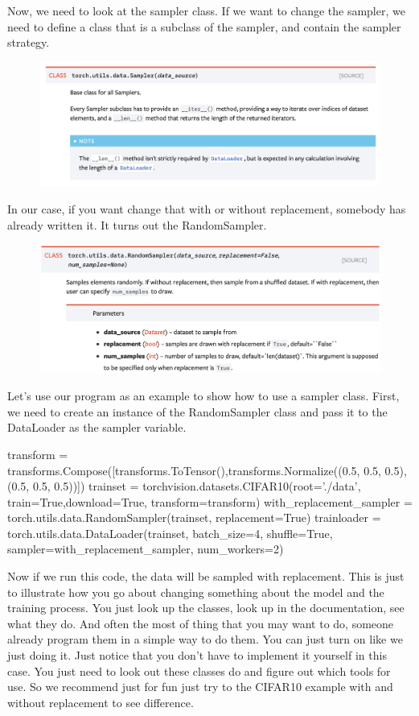 Now, we need to look at the sampler class. If we want to change the sampler, we need to define a class that is a subclass of the sampler, and contain the sampler strategy.
\begin{figure}[H]
\centering
\includegraphics[scale=0.4]{./figures/497Proj_Sampler}
\end{figure}
In our case, if you want change that with or without replacement, somebody has already written it. 
It turns out the RandomSampler.
\begin{figure}[H]
\centering
\includegraphics[scale=0.4]{./figures/497Proj_RandomSampler}
\end{figure}
Let's use our program as an example to show how to use a sampler class. First, we need to create an instance of the RandomSampler class and pass it to the DataLoader as the sampler variable.
\begin{python}
	transform = transforms.Compose([transforms.ToTensor(),transforms.Normalize((0.5, 0.5, 0.5), (0.5, 0.5, 0.5))])
	trainset = torchvision.datasets.CIFAR10(root='./data', train=True,download=True, transform=transform)
	with_replacement_sampler = torch.utils.data.RandomSampler(trainset, replacement=True)
	trainloader = torch.utils.data.DataLoader(trainset, batch_size=4, shuffle=True, sampler=with_replacement_sampler, num_workers=2)
\end{python}
Now if we run this code, the data will be sampled with replacement. This is just to illustrate how you go about changing something about the model and the training process. You just look up the classes, look up in the documentation, see what they do. And often the most of thing that you may want to do, someone already program them in a simple way to do them. You can just turn on like we just doing it. Just notice that you don't have to implement it yourself in this case. You just need to look out these classes do and figure out which tools for use. So we recommend just for fun just try to the CIFAR10 example with and without replacement to see difference. 

